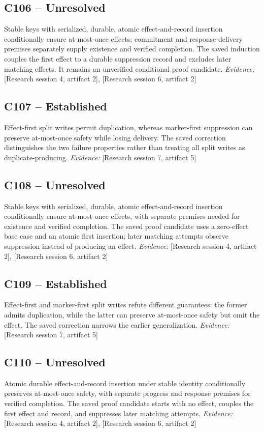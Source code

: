 \documentclass[11pt]{article}
\begin{document}
\begin{sloppypar}
\subsection{C106 -- Unresolved}
Stable keys with serialized, durable, atomic effect-and-record insertion conditionally ensure at-most-once effects; commitment and response-delivery premises separately supply existence and verified completion.
The saved induction couples the first effect to a durable suppression record and excludes later matching effects. It remains an unverified conditional proof candidate.
\textit{Evidence: }[Research session 4, artifact 2], [Research session 6, artifact 2]
\subsection{C107 -- Established}
Effect-first split writes permit duplication, whereas marker-first suppression can preserve at-most-once safety while losing delivery.
The saved correction distinguishes the two failure properties rather than treating all split writes as duplicate-producing.
\textit{Evidence: }[Research session 7, artifact 5]
\subsection{C108 -- Unresolved}
Stable keys with serialized, durable, atomic effect-and-record insertion conditionally ensure at-most-once effects, with separate premises needed for existence and verified completion.
The saved proof candidate uses a zero-effect base case and an atomic first insertion; later matching attempts observe suppression instead of producing an effect.
\textit{Evidence: }[Research session 4, artifact 2], [Research session 6, artifact 2]
\subsection{C109 -- Established}
Effect-first and marker-first split writes refute different guarantees: the former admits duplication, while the latter can preserve at-most-once safety but omit the effect.
The saved correction narrows the earlier generalization.
\textit{Evidence: }[Research session 7, artifact 5]
\subsection{C110 -- Unresolved}
Atomic durable effect-and-record insertion under stable identity conditionally preserves at-most-once safety, with separate progress and response premises for verified completion.
The saved proof candidate starts with no effect, couples the first effect and record, and suppresses later matching attempts.
\textit{Evidence: }[Research session 4, artifact 2], [Research session 6, artifact 2]

\end{sloppypar}
\end{document}
